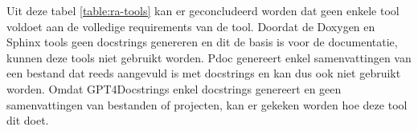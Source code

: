 Uit deze tabel \ref{table:ra-tools} kan er geconcludeerd worden dat geen enkele tool voldoet aan de volledige requirements van de tool.
Doordat de Doxygen en Sphinx tools geen docstrings genereren en dit de basis is voor de documentatie, kunnen deze tools niet gebruikt worden.
Pdoc genereert enkel samenvattingen van een bestand dat reeds aangevuld is met docstrings en kan dus ook niet gebruikt worden.
Omdat GPT4Docstrings enkel docstrings genereert en geen samenvattingen van bestanden of projecten, kan er gekeken worden hoe deze tool dit doet.
